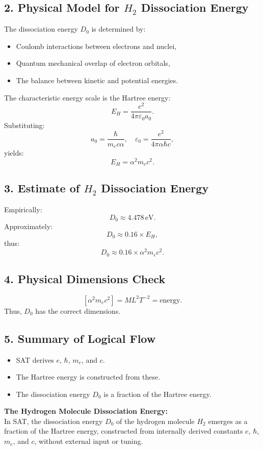 \documentclass[12pt]{article}
\begin{document}
\subsection*{2. Physical Model for \(H_2\) Dissociation Energy}
The dissociation energy \(D_0\) is determined by:
\begin{itemize}
    \item Coulomb interactions between electrons and nuclei,
    \item Quantum mechanical overlap of electron orbitals,
    \item The balance between kinetic and potential energies.
\end{itemize}

The characteristic energy scale is the Hartree energy:
\[
E_H = \frac{e^2}{4\pi \varepsilon_0 a_0}.
\]
Substituting:
\[
a_0 = \frac{\hbar}{m_e c \alpha}, \quad \varepsilon_0 = \frac{e^2}{4\pi \alpha \hbar c},
\]
yields:
\[
E_H = \alpha^2 m_e c^2.
\]

\subsection*{3. Estimate of \(H_2\) Dissociation Energy}
Empirically:
\[
D_0 \approx 4.478 \, \text{eV}.
\]
Approximately:
\[
D_0 \approx 0.16 \times E_H,
\]
thus:
\[
D_0 \approx 0.16 \times \alpha^2 m_e c^2.
\]

\subsection*{4. Physical Dimensions Check}
\[
[\alpha^2 m_e c^2] = M L^2 T^{-2} = \text{energy}.
\]
Thus, \(D_0\) has the correct dimensions.

\subsection*{5. Summary of Logical Flow}
\begin{itemize}
    \item SAT derives \(e\), \(\hbar\), \(m_e\), and \(c\).
    \item The Hartree energy is constructed from these.
    \item The dissociation energy \(D_0\) is a fraction of the Hartree energy.
\end{itemize}

\begin{mdframed}[linewidth=1pt, roundcorner=5pt, backgroundcolor=white]
\textbf{The Hydrogen Molecule Dissociation Energy:} \\
In SAT, the dissociation energy \( D_0 \) of the hydrogen molecule \( H_2 \) emerges as a fraction of the Hartree energy, constructed from internally derived constants \( e \), \( \hbar \), \( m_e \), and \( c \), without external input or tuning.
\end{mdframed}
\end{document}
